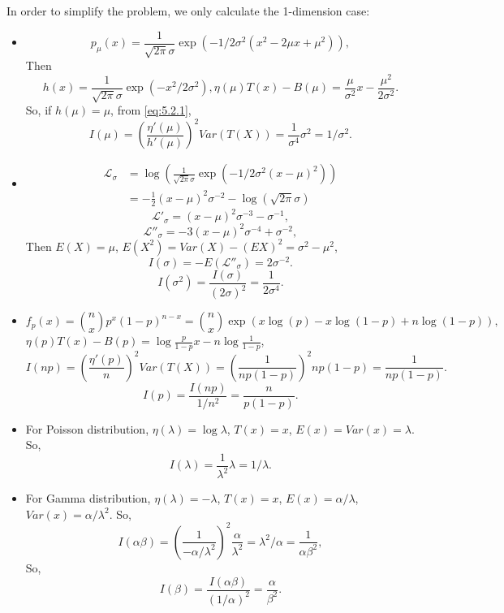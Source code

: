 \begin{solution}
    In order to simplify the problem, we only calculate the 1-dimension case: 
    \begin{itemize}
        \item \[
            p_\mu(x)=\frac{1}{\sqrt{2\pi}\sigma}\exp\left(-1/2\sigma^2(x^2-2\mu x+\mu^2)\right), 
        \]
        Then 
        \[
            h(x)=\frac{1}{\sqrt{2\pi}\sigma}\exp\left(-x^2/2\sigma^2\right), \eta(\mu) T(x)-B(\mu)=\frac{\mu}{\sigma^2}x-\frac{\mu^2}{2\sigma^2}. 
        \] 
        So, if $h(\mu)=\mu$, from \ref{eq:5.2.1}, 
        \[
            I(\mu)=\left(\frac{\eta'(\mu)}{h'(\mu)}\right)^2Var(T(X))=\frac{1}{\sigma^4}\sigma^2=1/\sigma^2. 
        \]
        \item \[
        \begin{aligned}
            \mathcal{L}_\sigma&=\log\left(\frac{1}{\sqrt{2\pi}\sigma}\exp\left(-1/2\sigma^2(x-\mu)^2\right)\right)\\
            &=-\frac{1}{2}\left(x-\mu\right)^2\sigma^{-2}-\log(\sqrt{2\pi}\sigma)
        \end{aligned}
        \]
        \[
            \mathcal{L}'_\sigma = \left(x-\mu\right)^2\sigma^{-3}-\sigma^{-1}, 
        \]
        \[
            \mathcal{L}''_\sigma = -3\left(x-\mu\right)^2\sigma^{-4}+\sigma^{-2}, 
        \]
        Then $E(X)=\mu$, $E(X^2)=Var(X)-(EX)^2=\sigma^2-\mu^2$, 
        \[
            I(\sigma)=-E(\mathcal{L''_\sigma})=2\sigma^{-2}. 
        \]
        \[
            I(\sigma^2)=\frac{I(\sigma)}{(2\sigma)^2}=\frac{1}{2\sigma^4}. 
        \]
        \item \[
            f_p(x)=\binom{n}{x}p^x(1-p)^{n-x}=\binom{n}{x}\exp\left(x\log(p)-x\log(1-p)+n\log(1-p)\right), 
        \]
        $\eta(p)T(x)-B(p)=\log\frac{p}{1-p}x-n\log\frac{1}{1-p}$, 
        \[
            I(np)=\left(\frac{\eta'(p)}{n}\right)^2Var(T(X))=\left(\frac{1}{np(1-p)}\right)^2np(1-p)=\frac{1}{np(1-p)}. 
        \]
        \[
            I(p)=\frac{I(np)}{1/n^2}=\frac{n}{p(1-p)}. 
        \]
        \item For Poisson distribution, $\eta(\lambda)=\log \lambda$, $T(x)=x$, $E(x)=Var(x)=\lambda$. So, 
        \[
            I(\lambda)=\frac{1}{\lambda^2}\lambda=1/\lambda. 
        \]
        \item For Gamma distribution, $\eta(\lambda)=-\lambda$, $T(x)=x$, $E(x)=\alpha/\lambda$, $Var(x)=\alpha/\lambda^2$. So,
        \[
            I(\alpha\beta)=\left(\frac{1}{-\alpha/\lambda^2}\right)^2\frac{\alpha}{\lambda^2}=\lambda^2/\alpha=\frac{1}{\alpha\beta^2}, 
        \]
        So, \[
            I(\beta)=\frac{I(\alpha\beta)}{(1/\alpha)^2}=\frac{\alpha}{\beta^2}. 
        \]
    \end{itemize}
\end{solution}

